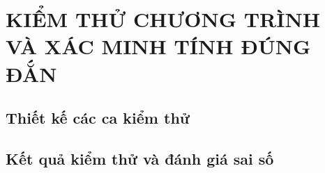 \chapter{KIỂM THỬ CHƯƠNG TRÌNH VÀ XÁC MINH TÍNH ĐÚNG ĐẮN}
\section{Thiết kế các ca kiểm thử}

\section{Kết quả kiểm thử và đánh giá sai số}

